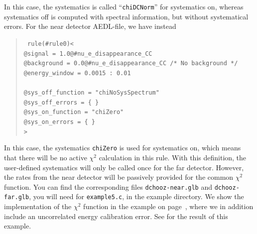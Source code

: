 In this case, the systematics is called ``{\tt chiDCNorm}'' for systematics on, whereas systematics
off is computed with spectral information, but without systematical errors.
For the near detector AEDL-file, we have instead
\begin{quote}
{\tt
rule(\#rule0)< \\
\hspace*{0.5cm}        @signal     = 1.0@\#nu\_e\_disappearance\_CC \\
\hspace*{0.5cm}        @background = 0.0@\#nu\_e\_disappearance\_CC   /* No background */ \\
\hspace*{0.5cm} @energy\_window = 0.0015 : 0.01 \\
\\
\hspace*{0.5cm}        @sys\_off\_function = "chiNoSysSpectrum" \\
\hspace*{0.5cm}        @sys\_off\_errors   = \{ \} \\
\hspace*{0.5cm}        @sys\_on\_function  = "chiZero" \\
\hspace*{0.5cm}        @sys\_on\_errors    = \{ \} \\
> 
}
\end{quote}
In this case, the systematics {\tt chiZero} is used for systematics on, which means that there will
be no active $\chi^2$ calculation in this rule. With this definition, the user-defined systematics
will only be called once for the far detector. However, the rates from the near detector will be 
passively provided for the common $\chi^2$ function.
You can find the corresponding files {\tt dchooz-near.glb} and {\tt dchooz-far.glb}, you will need for {\tt example5.c}, in the example directory. 
%
We show the implementation of the $\chi^2$ function in the example on page~\pageref{ex:syst},
where we in addition include an uncorrelated energy calibration error. See  for the result
of this example.
%
